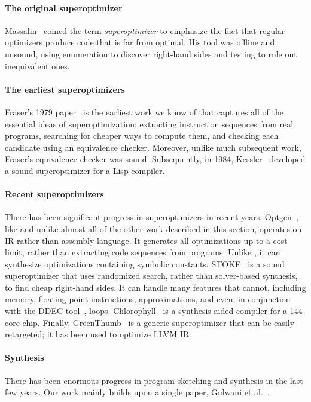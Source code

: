 \paragraph{The original superoptimizer}
%
Massalin~\cite{Massalin87} coined the term \emph{superoptimizer} to
emphasize the fact that regular optimizers produce code that is
far from optimal.
%
His tool was offline and unsound, using enumeration to discover
right-hand sides and testing to rule out inequivalent ones.


\paragraph{The earliest superoptimizers}
%
Fraser's 1979 paper~\cite{Fraser79} is the earliest work we know of
that captures all of the essential ideas of superoptimization:
extracting instruction sequences from real programs, searching for
cheaper ways to compute them, and checking each candidate using an
equivalence checker.
%
Moreover, unlike much subsequent work, Fraser's equivalence checker
was sound.
%
Subsequently, in 1984, Kessler~\cite{Kessler84} developed a sound
superoptimizer for a Lisp compiler.


\paragraph{Recent superoptimizers}
%
There has been significant progress in superoptimizers in recent
years.
%
Optgen~\cite{Buchwald15}, like \tool{} and unlike almost all of the
other work described in this section, operates on IR rather than
assembly language.
%
It generates all optimizations up to a cost limit, rather than
extracting code sequences from programs.
%
Unlike \tool{}, it can synthesize optimizations containing symbolic
constants.
%
STOKE~\cite{Schkufza13,Schkufza14,Sharma15} is a sound superoptimizer
that uses randomized search, rather than solver-based synthesis, to
find cheap right-hand sides.
%
It can handle many features that \tool{} cannot, including memory,
floating point instructions, approximations, and even, in conjunction
with the DDEC tool~\cite{Sharma13}, loops.
%
Chlorophyll~\cite{Phothilimthana14} is a synthesis-aided compiler for
a 144-core chip.
%
Finally, GreenThumb~\cite{Phothilimthana16} is a generic
superoptimizer that can be easily retargeted; it has been used to
optimize LLVM IR\@.




\paragraph{Synthesis}
%
There has been enormous progress in program sketching and synthesis in
the last few years.
%
Our work mainly builds upon a single paper, Gulwani et
al.~\cite{Gulwani11}.
